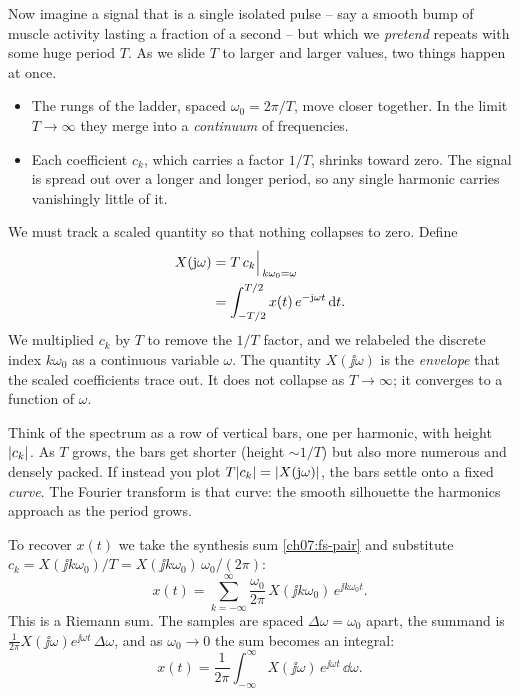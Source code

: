Now imagine a signal that is a single isolated pulse -- say a smooth bump
of muscle activity lasting a fraction of a second -- but which we \emph{pretend} repeats
with some huge period $T$. As we slide $T$ to larger and larger values, two things
happen at once.

\begin{itemize}
  \item The rungs of the ladder, spaced $\omega_0 = 2\pi/T$, move closer together.
        In the limit $T\to\infty$ they merge into a \emph{continuum} of frequencies.
  \item Each coefficient $c_k$, which carries a factor $1/T$, shrinks toward zero. The
        signal is spread out over a longer and longer period, so any single harmonic
        carries vanishingly little of it.
\end{itemize}

We must track a scaled quantity so that nothing collapses to zero. Define
\begin{align}
\label{ch07:envelope}
X(\mathrm{j}\omega) &= T\,c_k \Big|_{\,k\omega_0 = \omega} \notag \\
&= \int_{-T/2}^{T/2} x(t)\, e^{-\mathrm{j} \omega t}\, \mathrm{d} t .
\end{align}
We multiplied $c_k$ by $T$ to remove the $1/T$ factor, and we relabeled the discrete
index $k\omega_0$ as a continuous variable $\omega$. The quantity $X(\jj\omega)$ is the
\emph{envelope} that the scaled coefficients trace out. It does not collapse as
$T\to\infty$; it converges to a function of $\omega$.

\begin{intuitionbox}
Think of the spectrum as a row of vertical bars, one per harmonic, with height
$\lvert c_k\rvert$. As $T$ grows, the bars get shorter (height $\sim 1/T$) but also more
numerous and densely packed. If instead you plot $T\lvert c_k\rvert = \lvert X(\mathrm{j}\omega)\rvert$,
the bars settle onto a fixed \emph{curve}. The Fourier transform is that curve: the
smooth silhouette the harmonics approach as the period grows.
\end{intuitionbox}

To recover $x(t)$ we take the synthesis sum \eqref{ch07:fs-pair} and substitute
$c_k = X(\jj k\omega_0)/T = X(\jj k\omega_0)\,\omega_0/(2\pi)$:
\begin{equation}
x(t) = \sum_{k=-\infty}^{\infty} \frac{\omega_0}{2\pi}\, X(\jj k\omega_0)\, e^{\jj k\omega_0 t}.
\end{equation}
This is a Riemann sum. The samples are spaced $\Delta\omega = \omega_0$ apart, the
summand is $\frac{1}{2\pi} X(\jj\omega)e^{\jj\omega t}\,\Delta\omega$, and as
$\omega_0\to 0$ the sum becomes an integral:
\begin{equation}
\label{ch07:ift}
x(t) = \frac{1}{2\pi}\int_{-\infty}^{\infty} X(\jj\omega)\, e^{\jj\omega t}\, \dd\omega .
\end{equation}

